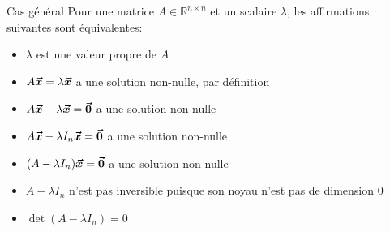 \documentclass[a4paper]{article}
\begin{document}
\begin{parag}{Cas général}
    Pour une matrice $A \in \mathbb{R}^{n \times n}$ et un scalaire $\lambda$, les affirmations suivantes sont équivalentes:
    \begin{itemize}
        \item $\lambda$ est une valeur propre de $A$
        \item $A \bm{\protect\vec{x}} = \lambda \bm{\protect\vec{x}}$ a une solution non-nulle, par définition
        \item $A \bm{\protect\vec{x}} - \lambda \bm{\protect\vec{x}} = \bm{\protect\vec{0}}$ a une solution non-nulle
        \item $A \bm{\protect\vec{x}} - \lambda I_n\bm{\protect\vec{x}} = \bm{\protect\vec{0}}$ a une solution non-nulle
        \item $\left(A - \lambda I_n\right)\bvec{x} = \bvec{0}$ a une solution non-nulle
        \item $A - \lambda I_n$ n'est pas inversible puisque son noyau n'est pas de dimension $0$
        \item $\det\left(A - \lambda I_n\right) = 0$
    \end{itemize}
\end{parag}
\end{document}
